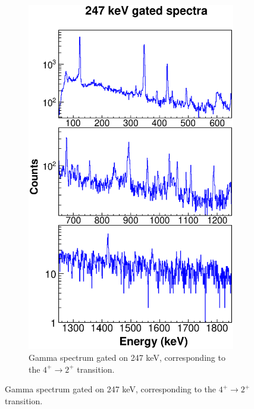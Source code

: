     \begin{figure}
    \ContinuedFloat
    \begin{subfigure}{\textwidth}
    \includegraphics[scale=0.8]{154GdTablesAndFigs/247_gamma.eps}
    \caption{Gamma spectrum gated on 247 keV, corresponding to the $4^+\rightarrow2^+$ transition.}
    \label{fig:154_4to2spec}
    \end{subfigure}
\end{figure}